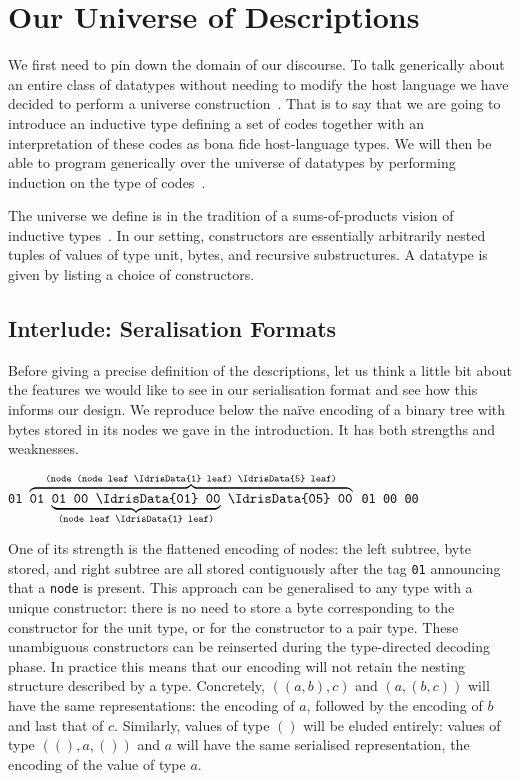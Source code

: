 \section{Our Universe of Descriptions}\label{sec:desc}

We first need to pin down the domain of our discourse.
%
To talk generically about an entire class of datatypes
without needing to modify the host language
we have decided to perform a universe
construction~\citep{DBLP:journals/njc/BenkeDJ03, DBLP:phd/ethos/Morris07, DBLP:conf/icfp/LohM11}.
%
That is to say that we are going to introduce an inductive type
defining a set of codes together
with an interpretation of these codes as bona fide
host-language types.
%
We will then be able to program generically over the universe of
datatypes by performing induction on the type of
codes~\citep{DBLP:conf/tphol/PfeiferR99}.

The universe we define is in the tradition of
a sums-of-products vision of inductive types~\citep{DBLP:conf/popl/JanssonJ97}.
%
In our setting, constructors are essentially arbitrarily nested tuples of
values of type unit,
bytes,
and recursive substructures.
%
A datatype is given by listing a choice of constructors.

\subsection{Interlude: Seralisation Formats}

Before giving a precise definition of the descriptions, let us think
a little bit about the features we would like to see in our serialisation
format and see how this informs our design.
%
We reproduce below the naïve encoding of a binary tree with bytes stored
in its nodes we gave in the introduction. It has both strengths and
weaknesses.

\begin{center}
  \usestt
      \texttt{01 $\overbrace{\texttt{01 $\underbrace{\texttt{01 00 \IdrisData{01} 00}}_{\texttt{(node leaf \IdrisData{1} leaf)}}$
    \IdrisData{05} 00}}^{\texttt{(node (node leaf \IdrisData{1} leaf) \IdrisData{5} leaf)}}$
     01 00  00}
\end{center}

One of its strength is the flattened encoding of nodes:
the left subtree, byte stored, and right subtree are all stored
contiguously after the tag \texttt{01} announcing that a \texttt{node} is present.
%
This approach can be generalised to any type with a unique constructor:
there is no need to store a byte corresponding to the constructor for the
unit type, or for the constructor to a pair type. These unambiguous
constructors can be reinserted during the type-directed decoding phase.
%
In practice this means that our encoding will not retain the nesting
structure described by a type. Concretely, $((a, b), c)$ and $(a, (b, c))$
will have the same representations: the encoding of $a$, followed by the
encoding of $b$ and last that of $c$.
%
Similarly, values of type $()$ will be eluded entirely: values of type
$((), a, ())$ and $a$ will have the same serialised representation, the
encoding of the value of type $a$.


